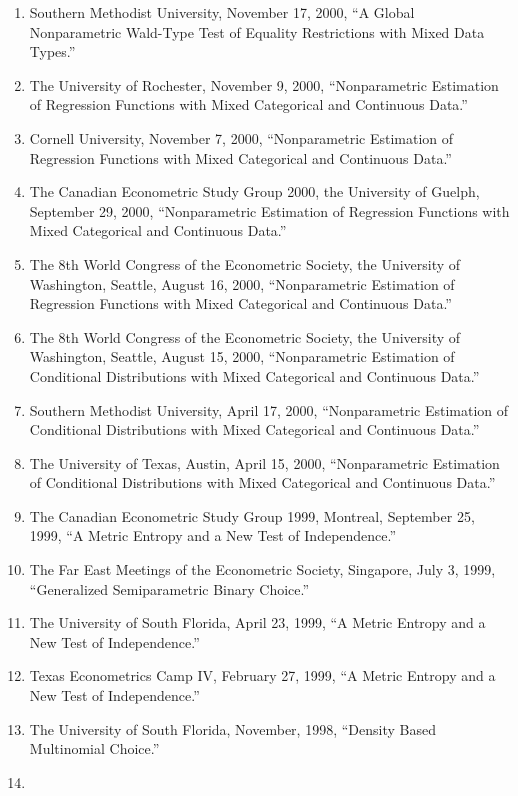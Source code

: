 \documentclass[
]{article}
\begin{document}
\begin{enumerate}
  Nonparametric Kernel Estimation with Mixed Data Types.''
\item
  Southern Methodist University, November 17, 2000, ``A Global
  Nonparametric Wald-Type Test of Equality Restrictions with Mixed Data
  Types.''
\item
  The University of Rochester, November 9, 2000, ``Nonparametric
  Estimation of Regression Functions with Mixed Categorical and
  Continuous Data.''
\item
  Cornell University, November 7, 2000, ``Nonparametric Estimation of
  Regression Functions with Mixed Categorical and Continuous Data.''
\item
  The Canadian Econometric Study Group 2000, the University of Guelph,
  September 29, 2000, ``Nonparametric Estimation of Regression Functions
  with Mixed Categorical and Continuous Data.''
\item
  The 8th World Congress of the Econometric Society, the University of
  Washington, Seattle, August 16, 2000, ``Nonparametric Estimation of
  Regression Functions with Mixed Categorical and Continuous Data.''
\item
  The 8th World Congress of the Econometric Society, the University of
  Washington, Seattle, August 15, 2000, ``Nonparametric Estimation of
  Conditional Distributions with Mixed Categorical and Continuous
  Data.''
\item
  Southern Methodist University, April 17, 2000, ``Nonparametric
  Estimation of Conditional Distributions with Mixed Categorical and
  Continuous Data.''
\item
  The University of Texas, Austin, April 15, 2000, ``Nonparametric
  Estimation of Conditional Distributions with Mixed Categorical and
  Continuous Data.''
\item
  The Canadian Econometric Study Group 1999, Montreal, September 25,
  1999, ``A Metric Entropy and a New Test of Independence.''
\item
  The Far East Meetings of the Econometric Society, Singapore, July 3,
  1999, ``Generalized Semiparametric Binary Choice.''
\item
  The University of South Florida, April 23, 1999, ``A Metric Entropy
  and a New Test of Independence.''
\item
  Texas Econometrics Camp IV, February 27, 1999, ``A Metric Entropy and
  a New Test of Independence.''
\item
  The University of South Florida, November, 1998, ``Density Based
  Multinomial Choice.''
\item

\end{enumerate}
\end{document}
